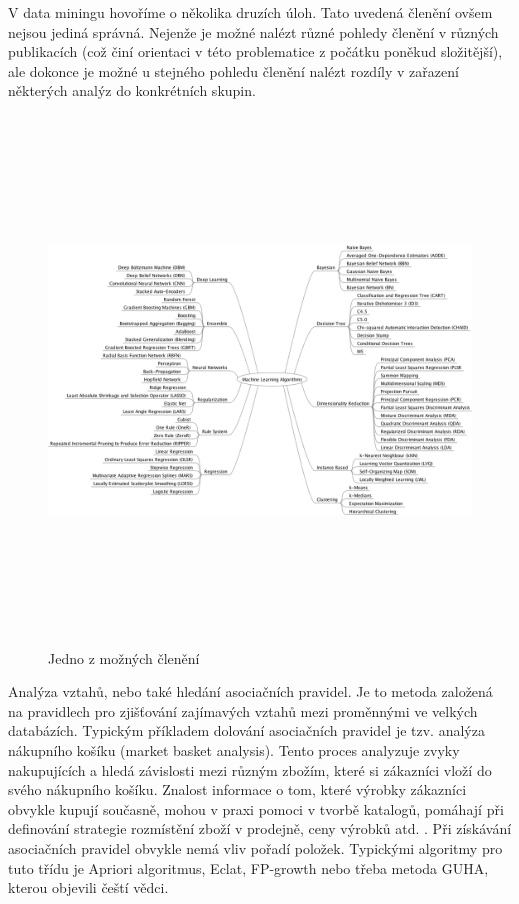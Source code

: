 \documentclass[12pt]{article}
\begin{document}
V data miningu hovoříme o několika druzích úloh. Tato uvedená členění ovšem nejsou jediná správná. Nejenže je možné nalézt různé pohledy členění v různých publikacích (což činí orientaci v této problematice z počátku poněkud složitější), ale dokonce je možné u stejného pohledu členění nalézt rozdíly v zařazení některých analýz do konkrétních skupin. 
\begin{figure}[h]
\hspace*{-1cm}  
  \centering
  \includegraphics[height=14cm,width=16cm]{img/MLA.png}
  \caption{Jedno z možných členění \citep{mla}}
\end{figure}

Analýza vztahů, nebo také hledání asociačních pravidel. Je to metoda založená na pravidlech pro zjišťování zajímavých vztahů mezi proměnnými ve velkých databázích. Typickým příkladem dolování asociačních pravidel je tzv. analýza nákupního košíku (market
basket analysis). Tento proces analyzuje zvyky nakupujících a hledá závislosti mezi různým
zbožím, které si zákazníci vloží do svého nákupního košíku. Znalost informace o tom, které výrobky zákazníci obvykle kupují současně, mohou v praxi pomoci v tvorbě katalogů, pomáhají
při definování strategie rozmístění zboží v prodejně, ceny výrobků atd. \citep{burda}. Při získávání asociačních pravidel obvykle nemá vliv pořadí položek.
Typickými algoritmy pro tuto třídu je Apriori algoritmus, Eclat, FP-growth nebo třeba metoda GUHA, kterou objevili čeští vědci. 
\end{document}
